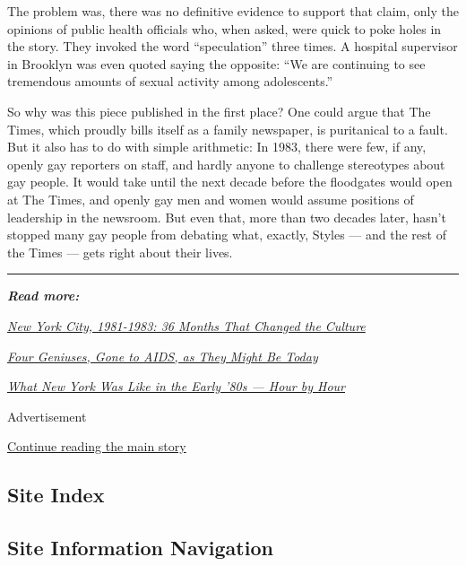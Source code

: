 The problem was, there was no definitive evidence to support that claim,
only the opinions of public health officials who, when asked, were quick
to poke holes in the story. They invoked the word ``speculation'' three
times. A hospital supervisor in Brooklyn was even quoted saying the
opposite: ``We are continuing to see tremendous amounts of sexual
activity among adolescents.''

So why was this piece published in the first place? One could argue that
The Times, which proudly bills itself as a family newspaper, is
puritanical to a fault. But it also has to do with simple arithmetic: In
1983, there were few, if any, openly gay reporters on staff, and hardly
anyone to challenge stereotypes about gay people. It would take until
the next decade before the floodgates would open at The Times, and
openly gay men and women would assume positions of leadership in the
newsroom. But even that, more than two decades later, hasn't stopped
many gay people from debating what, exactly, Styles --- and the rest of
the Times --- gets right about their lives.

\begin{center}\rule{0.5\linewidth}{\linethickness}\end{center}

\emph{\textbf{Read more:}}

\emph{\href{https://www.nytimes3xbfgragh.onion/interactive/2018/04/17/t-magazine/new-york-1980s-culture.html}{New
York City, 1981-1983: 36 Months That Changed the Culture}}

\emph{\href{https://www.nytimes3xbfgragh.onion/2018/04/19/t-magazine/keith-haring-tina-chow-aids-resurrected.html}{Four
Geniuses, Gone to AIDS, as They Might Be Today}}

\emph{\href{https://www.nytimes3xbfgragh.onion/2018/04/17/t-magazine/24-hours-new-york-city-1980s-life.html}{What
New York Was Like in the Early '80s --- Hour by Hour}}

Advertisement

\protect\hyperlink{after-bottom}{Continue reading the main story}

\hypertarget{site-index}{%
\subsection{Site Index}\label{site-index}}

\hypertarget{site-information-navigation}{%
\subsection{Site Information
Navigation}\label{site-information-navigation}}

